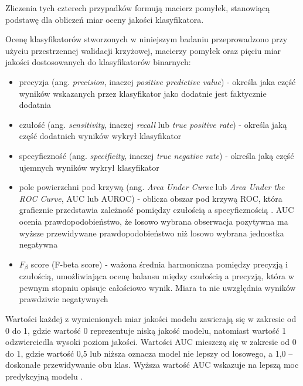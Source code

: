 \documentclass{amuthesis}
\begin{document}
Zliczenia tych czterech przypadków formują macierz pomyłek, stanowiącą
podstawę dla obliczeń miar oceny jakości klasyfikatora.

Ocenę klasyfikatorów stworzonych w niniejszym badaniu przeprowadzono
przy użyciu przestrzennej walidacji krzyżowej, macierzy pomyłek oraz
pięciu miar jakości dostosowanych do klasyfikatorów binarnych:

\begin{itemize}
\item
  precyzja (ang. \emph{precision}, inaczej \emph{positive predictive
  value}) - określa jaka część wyników wskazanych przez klasyfikator
  jako dodatnie jest faktycznie dodatnia
  \autocite{jaworski_2013_perfomance_measures}
\item
  czułość (ang. \emph{sensitivity}, inaczej \emph{recall} lub \emph{true
  positive rate}) - określa jaką część dodatnich wyników wykrył
  klasyfikator \autocite{jaworski_2013_perfomance_measures}
\item
  specyficzność (ang. \emph{specificity}, inaczej \emph{true negative
  rate}) - określa jaką część ujemnych wyników wykrył klasyfikator
  \autocite{jaworski_2013_perfomance_measures}
\item
  pole powierzchni pod krzywą (ang. \emph{Area Under Curve} lub
  \emph{Area Under the ROC Curve}, AUC lub AUROC) - oblicza obszar pod
  krzywą ROC, która graficznie przedstawia zależność pomiędzy czułością
  a specyficznością \autocite{jaworski_2013_perfomance_measures}. AUC
  ocenia prawdopodobieństwo, że losowo wybrana obserwacja pozytywna ma
  wyższe przewidywane prawdopodobieństwo niż losowo wybrana jednostka
  negatywna \autocite{R-mlr3measures}
\item
  \(F_{\beta}\) score (F-beta score) - ważona średnia harmoniczna
  pomiędzy precyzją i czułością, umożliwiająca ocenę balansu między
  czułością a precyzją, która w pewnym stopniu opisuje całościowo wynik.
  Miara ta nie uwzględnia wyników prawdziwie negatywnych
  \autocite{zygierewicz_2021_ml}
\end{itemize}

Wartości każdej z wymienionych miar jakości modelu zawierają się w
zakresie od 0 do 1, gdzie wartość 0 reprezentuje niską jakość modelu,
natomiast wartość 1 odzwierciedla wysoki poziom jakości. Wartości AUC
mieszczą się w zakresie od 0 do 1, gdzie wartość 0,5 lub niższa oznacza
model nie lepszy od losowego, a 1,0 -- doskonałe przewidywanie obu klas.
Wyższa wartość AUC wskazuje na lepszą moc predykcyjną modelu
\autocite{lovelace_2019_geocomputation}.
\end{document}
